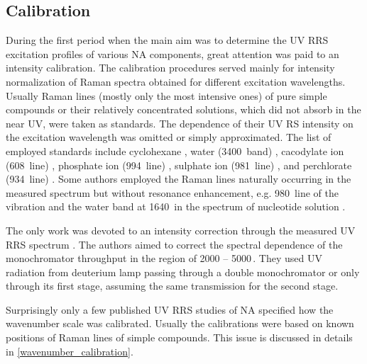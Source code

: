 \subsection{Calibration}

During the first period when the main aim was to determine the UV RRS
excitation profiles of various NA components, great attention was paid to an
intensity calibration.
The calibration procedures served mainly for intensity normalization of Raman
spectra obtained for different excitation wavelengths.
Usually Raman lines (mostly only the most intensive ones) of pure simple
compounds or their relatively concentrated solutions, which did not absorb in
the near UV, were taken as standards.
The dependence of their UV RS intensity on the excitation wavelength was
omitted or simply approximated.
The list of employed standards include cyclohexane
\parencite{Hamaguchi1974},
water (3400\,\icm{} band)
\parencite{%
	Chinsky1978,%
	Fodor1985%
},
cacodylate ion (608\,\icm{} line)
\parencite{%
	Blazej1977,%
	Samanta1982%
},
phosphate ion (994\,\icm{} line)
\parencite{Kubasek1985},
sulphate ion (981\,\icm{} line)
\parencite{%
	Perno1989,%
	Benson1992,%
	Wen1998%
},
and perchlorate (934\,\icm{} line)
\parencite{Rodgers1992}.
Some authors employed the Raman lines naturally occurring in the measured
spectrum but without resonance enhancement, e.g. 980\,\icm{} line of the
vibration and the water band at 1640\,\icm{} in the spectrum of nucleotide
solution
\parencite{Tsuboi1974}.

The only work was devoted to an intensity correction through the measured
UV RRS spectrum
\parencite{Chinsky1983a}.
The authors aimed to correct the spectral dependence of the monochromator
throughput in the region of 2000 -- 5000\,\icm.
They used UV radiation from deuterium lamp passing through a double
monochromator or only through its first stage, assuming the same transmission
for the second stage.

Surprisingly only a few published UV RRS studies of NA specified how the
wavenumber scale was calibrated.
Usually the calibrations were based on known positions of Raman lines of
simple compounds.
This issue is discussed in details in
\cref{wavenumber_calibration}.
